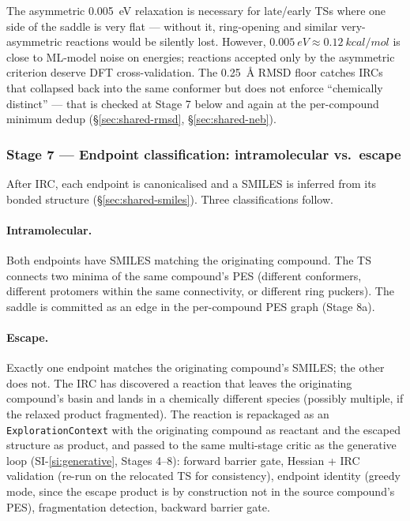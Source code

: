 The asymmetric \SI{0.005}{eV} relaxation is necessary for late/early TSs where one side of the saddle is very flat --- without it, ring-opening and similar very-asymmetric reactions would be silently lost. However, $\SI{0.005}{eV} \approx \SI{0.12}{kcal/mol}$ is close to ML-model noise on energies; reactions accepted only by the asymmetric criterion deserve DFT cross-validation. The \SI{0.25}{\angstrom} RMSD floor catches IRCs that collapsed back into the same conformer but does not enforce ``chemically distinct'' --- that is checked at Stage 7 below and again at the per-compound minimum dedup (\S\ref{sec:shared-rmsd}, \S\ref{sec:shared-neb}).


\subsubsection{Stage 7 --- Endpoint classification: intramolecular vs.\ escape}
\label{sec:pes-classify}

After IRC, each endpoint is canonicalised and a SMILES is inferred from its bonded structure (\S\ref{sec:shared-smiles}). Three classifications follow.

\paragraph{Intramolecular.}
Both endpoints have SMILES matching the originating compound. The TS connects two minima of the same compound's PES (different conformers, different protomers within the same connectivity, or different ring puckers). The saddle is committed as an edge in the per-compound PES graph (Stage 8a).

\paragraph{Escape.}
Exactly one endpoint matches the originating compound's SMILES; the other does not. The IRC has discovered a reaction that leaves the originating compound's basin and lands in a chemically different species (possibly multiple, if the relaxed product fragmented). The reaction is repackaged as an \texttt{ExplorationContext} with the originating compound as reactant and the escaped structure as product, and passed to the same multi-stage critic as the generative loop (SI-\ref{si:generative}, Stages 4--8): forward barrier gate, Hessian + IRC validation (re-run on the relocated TS for consistency), endpoint identity (greedy mode, since the escape product is by construction not in the source compound's PES), fragmentation detection, backward barrier gate.

